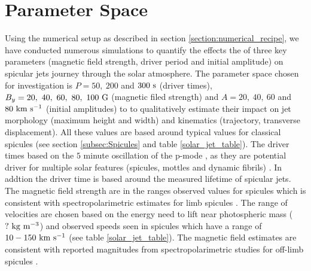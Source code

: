 \documentclass[12pt]{ociamthesis}
\newcommand{\kms}{~\rm{km ~s^{-1}}}
\newcommand{\kgm}{~\rm{kg ~m^{-3}}}
\newcommand{\np}{\\ \\}
\begin{document}
\section{Parameter Space}
\label{subsec:paramater_space}
Using the numerical setup as described in section \ref{section:numerical_recipe}, we have conducted numerous simulations to quantify the effects the of three key parameters (magnetic field strength, driver period and initial amplitude) on spicular jets journey through the solar atmosphere. The parameter space chosen for investigation is $P=50,~200$ and $300~\rm{s}$ (driver times), $B_y=20,~40,~60,~80,~100~\rm{G}$ (magnetic filed strength) and $A=20,~40,~60$ and $80 \kms$ (initial amplitudes) to to qualitatively estimate their impact on jet morphology (maximum height and width) and kinematics (trajectory, transverse displacement). All these values are based around typical values for classical spicules (see section \ref{subsec:Spicules} and table \ref{solar_jet_table}). The driver times based on the $5$ minute oscillation of the p-mode \citep{Leighton1962ApJ135474L}, as they are potential driver for multiple solar features (spicules, mottles  and dynamic fibrils) \citep{Pontieu2004Natur}. In addtion the driver time is based around the measured lifetime of spicular jets. The magnetic field strength are in the ranges observed values for spicules which is consistent with spectropolarimetric estimates for limb spicules \citep{centeno2010, suarez2015}. The range of velocities are chosen based on the energy need to lift near photospheric mass ($?\kgm$) and observed speeds seen in spicules which have a range of $10-150\kms$ (see table \ref{solar_jet_table}). The magnetic field estimates are consistent with reported magnitudes from spectropolarimetric studies for off-limb spicules \citep{centeno2010, suarez2015}. \np
\end{document}
